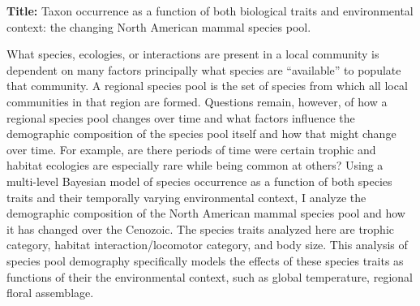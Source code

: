 \documentclass[12pt,letterpaper]{article}
\begin{document}
\textbf{Title:} Taxon occurrence as a function of both biological traits and environmental context: the changing North American mammal species pool.

What species, ecologies, or interactions are present in a local community is dependent on many factors principally what species are ``available'' to populate that community. A regional species pool is the set of species from which all local communities in that region are formed. Questions remain, however, of how a regional species pool changes over time and what factors influence the demographic composition of the species pool itself and how that might change over time. For example, are there periods of time were certain trophic and habitat ecologies are especially rare while being common at others? Using a multi-level Bayesian model of species occurrence as a function of both species traits and their temporally varying environmental context, I analyze the demographic composition of the North American mammal species pool and how it has changed over the Cenozoic. The species traits analyzed here are trophic category, habitat interaction/locomotor category, and body size. This analysis of species pool demography specifically models the effects of these species traits as functions of their the environmental context, such as global temperature, regional floral assemblage.



\end{document}
